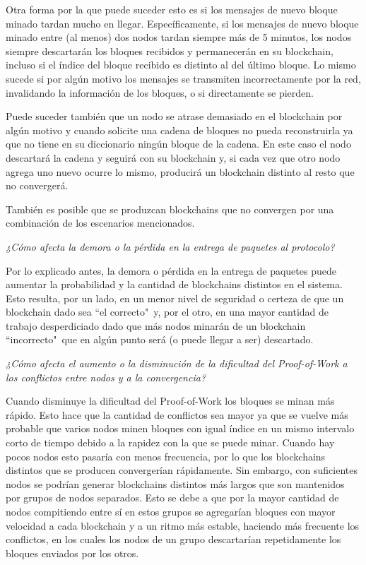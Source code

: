 Otra forma por la que puede suceder esto es si los mensajes de nuevo bloque minado tardan mucho en llegar. Específicamente, si los mensajes de nuevo bloque minado entre (al menos) dos nodos tardan siempre más de 5 minutos, los nodos siempre descartarán los bloques recibidos y permanecerán en su blockchain, incluso si el índice del bloque recibido es distinto al del último bloque. Lo mismo sucede si por algún motivo los mensajes se transmiten incorrectamente por la red, invalidando la información de los bloques, o si directamente se pierden.

Puede suceder también que un nodo se atrase demasiado en el blockchain por algún motivo y cuando solicite una cadena de bloques no pueda reconstruirla ya que no tiene en su diccionario ningún bloque de la cadena. En este caso el nodo descartará la cadena y seguirá con su blockchain y, si cada vez que otro nodo agrega uno nuevo ocurre lo mismo, producirá un blockchain distinto al resto que no convergerá.

También es posible que se produzcan blockchains que no convergen por una combinación de los escenarios mencionados.

\emph{¿Cómo afecta la demora o la pérdida en la entrega de paquetes al protocolo?}

Por lo explicado antes, la demora o pérdida en la entrega de paquetes puede aumentar la probabilidad y la cantidad de blockchains distintos en el sistema. Esto resulta, por un lado, en un menor nivel de seguridad o certeza de que un blockchain dado sea ``el correcto"\ y, por el otro, en una mayor cantidad de trabajo desperdiciado dado que más nodos minarán de un blockchain ``incorrecto"\ que en algún punto será (o puede llegar a ser) descartado.

\emph{¿Cómo afecta el aumento o la disminución de la dificultad del Proof-of-Work a los conflictos entre nodos y a la convergencia?}

Cuando disminuye la dificultad del Proof-of-Work los bloques se minan más rápido. Esto hace que la cantidad de conflictos sea mayor ya que se vuelve más probable que varios nodos minen bloques con igual índice en un mismo intervalo corto de tiempo debido a la rapidez con la que se puede minar. Cuando hay pocos nodos esto pasaría con menos frecuencia, por lo que los blockchains distintos que se producen convergerían rápidamente. Sin embargo, con suficientes nodos se podrían generar blockchains distintos más largos que son mantenidos por grupos de nodos separados. Esto se debe a que por la mayor cantidad de nodos compitiendo entre sí en estos grupos se agregarían bloques con mayor velocidad a cada blockchain y a un ritmo más estable, haciendo más frecuente los conflictos, en los cuales los nodos de un grupo descartarían repetidamente los bloques enviados por los otros.

